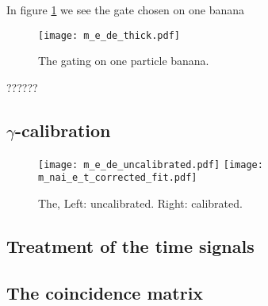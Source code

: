 \documentclass[11pt,a4wide]{article}
\begin{document}
In figure \ref{fig: banana_gate} we see the gate chosen on one banana

\begin{figure}[htp]
\centering
\texttt{[image: m\_e\_de\_thick.pdf]}
\caption{The gating on one particle banana.}
\label{fig: banana_gate}
\end{figure}



??????

\subsection{$\gamma$-calibration}

\begin{figure}[htp]
\centering
\texttt{[image: m\_e\_de\_uncalibrated.pdf]}
\texttt{[image: m\_nai\_e\_t\_corrected\_fit.pdf]}
\caption{The, Left: uncalibrated. Right: calibrated.}
\label{fig: time_corr}
\end{figure}


\subsection{Treatment of the time signals}

\subsection{ The coincidence matrix}
\end{document}
